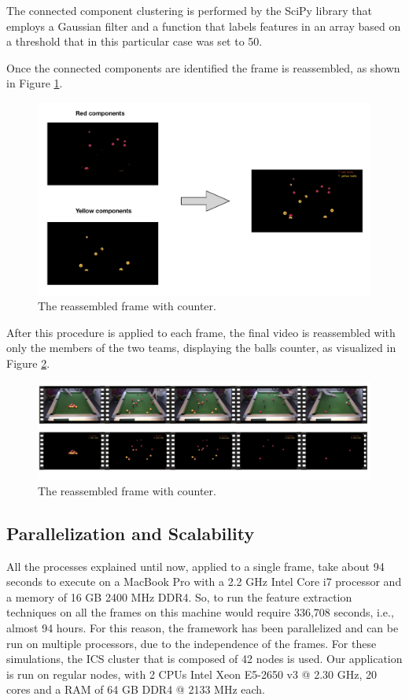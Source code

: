\documentclass{usiinftr}
\begin{document}
The connected component clustering is performed by the SciPy library that employs a Gaussian filter and a function that labels features in an array based on a threshold that in this particular case was set to 50.

Once the connected components are identified the frame is reassembled, as shown in Figure \ref{fig:8}. 
\begin{figure}[h]
	\centering
	\includegraphics[width=0.7\linewidth]{./img/to_frame}
	\caption{The reassembled frame with counter.}
	\label{fig:8}
\end{figure}

After this procedure is applied to each frame, the final video is reassembled with only the members of the two teams, displaying the balls counter, as visualized in Figure \ref{fig:10}. 
\begin{figure}[h]
	\centering
	\includegraphics[width=1\linewidth]{./img/frames}
	\caption{The reassembled frame with counter.}
	\label{fig:10}
\end{figure}

\subsection{Parallelization and Scalability}
All the processes explained until now, applied to a single frame, take about 94 seconds to execute on a MacBook Pro with a 2.2 GHz Intel Core i7 processor and a memory of 16 GB 2400 MHz DDR4. So, to run the feature extraction techniques on all the frames on this machine would require 336,708 seconds, i.e., almost 94 hours. For this reason, the framework has been parallelized and can be run on multiple processors, due to the independence of the frames. For these simulations, the ICS cluster that is composed of 42 nodes is used. Our application is run on regular nodes, with 2 CPUs Intel Xeon E5-2650 v3 @ 2.30 GHz, 20 cores and a RAM of 64 GB DDR4 @ 2133 MHz each.
\end{document}
